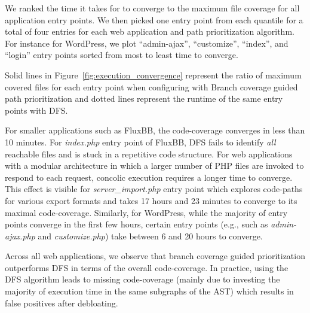 {We ranked the time it takes for \animatedead{} to converge to the maximum file coverage for all application entry points. 
We then picked one entry point from each quantile for a total of four entries for each web application and path prioritization algorithm. 
For instance for WordPress, we plot ``admin-ajax'', ``customize'', ``index'', and ``login''  entry points sorted from most to least time to converge. 

Solid lines in Figure~\ref{fig:execution_convergence} represent the ratio of maximum covered files for each entry point when configuring \animatedead{} with Branch coverage guided path prioritization and dotted lines represent the runtime of the same entry points with DFS. 

For smaller applications such as FluxBB, the code-coverage converges in less than 10 minutes. 
For \emph{index.php} entry point of FluxBB, DFS fails to identify \emph{all} reachable files and is stuck in a repetitive code structure. 
For web applications with a modular architecture in which a larger number of PHP files are invoked to respond to each request, concolic execution requires a longer time to converge. 
This effect is visible for \emph{server\_import.php} entry point which explores code-paths for various export formats and takes 17 hours and 23 minutes to converge to its maximal code-coverage. 
Similarly, for WordPress, while the majority of entry points converge in the first few hours, certain entry points (e.g., such as \emph{admin-ajax.php} and \emph{customize.php}) take between 6 and 20 hours to converge. 

Across all web applications, we observe that branch coverage guided prioritization outperforms DFS in terms of the overall code-coverage. 
In practice, using the DFS algorithm leads to missing code-coverage (mainly due to investing the majority of execution time in the same subgraphs of the AST) which results in false positives after debloating. 




}
